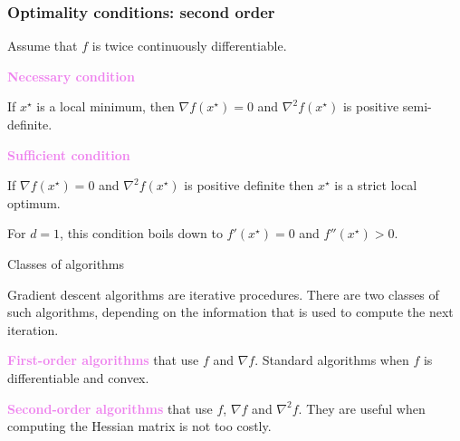 \documentclass[9pt]{beamer}
\begin{document}
\begin{frame}
	\frametitle{Optimality conditions: second order}
	
	\large
	
	Assume that $f$ is twice continuously differentiable.
	
	\bigskip
	
\textbf{\textcolor{violet}{Necessary condition}}
	
	\bigskip 
	
	If $x^{\star}$ is a local minimum, then \alert{$\nabla f(x^{\star}) = 0$ and $\nabla^2 f(x^{\star})$ is positive semi-definite}. 
	
	\bigskip
	
	\bigskip
	
\textbf{\textcolor{violet}{Sufficient condition}}
	
	\bigskip 
	
	If \alert{$\nabla f(x^{\star}) = 0$ and $\nabla^2 f(x^{\star})$ is positive definite} then $x^{\star}$ is a strict local optimum. 
	
		\bigskip
	

 For $d=1$, this condition boils down to \alert{$f'(x^{\star}) = 0$ and $f''(x^{\star}) >0$}. 
	
\end{frame}



\begin{frame}{Classes of algorithms}
	
	\large 
	
Gradient descent algorithms are  \alert{iterative procedures}. There are two classes of such algorithms, depending on the information that is used to compute the next iteration. 
	
	\bigskip 
	\bigskip
	
\textbf{\textcolor{violet}{First-order algorithms}} that use $f$ and $\nabla f$. Standard algorithms when $f$ is differentiable and convex. 
	
	\bigskip 
	\bigskip
	
\textbf{\textcolor{violet}{Second-order algorithms}} that use $f$, $\nabla f$ and $\nabla^2f$. They are useful when computing the Hessian matrix is not too costly. 
	
	
\end{frame}
\end{document}
